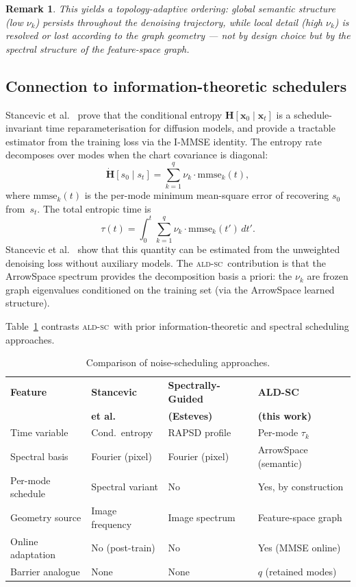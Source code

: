 \documentclass[11pt]{article}
\newtheorem{remark}{Remark}
\newcommand{\ALDSC}{\textsc{ald-sc}}
\begin{document}
\begin{remark}
This yields a topology-adaptive ordering: global semantic structure (low
\(\nu_k\)) persists throughout the denoising trajectory, while local detail
(high \(\nu_k\)) is resolved or lost according to the graph geometry --- not
by design choice but by the spectral structure of the feature-space graph.
\end{remark}

\subsection{Connection to information-theoretic schedulers}
\label{sec:stancevic}

Stancevic et al.~\cite{Stancevic2025} prove that the conditional entropy
\(\mathbf{H}[\mathbf{x}_0 \mid \mathbf{x}_t]\) is a schedule-invariant time
reparameterisation for diffusion models, and provide a tractable estimator
from the training loss via the I-MMSE identity. The entropy rate decomposes
over modes when the chart covariance is diagonal:
\[\dot{\mathbf{H}}[s_0 \mid s_t] = \sum_{k=1}^{q} \nu_k \cdot \mathrm{mmse}_k(t),\]
where \(\mathrm{mmse}_k(t)\) is the per-mode minimum mean-square error of
recovering \(s_0\) from~\(s_t\). The total entropic time is
\[\tau(t) = \int_0^t \sum_{k=1}^{q} \nu_k \cdot \mathrm{mmse}_k(t')\, dt'.\]
Stancevic et al.~\cite{Stancevic2025} show that this quantity can be estimated from the unweighted
denoising loss without auxiliary models. The \ALDSC~contribution is that the
ArrowSpace spectrum provides the decomposition basis a priori: the
\(\nu_k\) are frozen graph eigenvalues conditioned on the training set (via the ArrowSpace learned structure).

Table~\ref{tab:scheduler_comparison} contrasts \ALDSC~with prior
information-theoretic and spectral scheduling approaches.

\begin{table}[ht]
\centering
\small
\caption{Comparison of noise-scheduling approaches.}
\label{tab:scheduler_comparison}
\begin{tabular}{llll}
\toprule
\textbf{Feature} & \textbf{Stancevic} & \textbf{Spectrally-Guided} & \textbf{ALD-SC} \\
 & \textbf{et al.} & \textbf{(Esteves)} & \textbf{(this work)} \\
\midrule
Time variable & Cond.\ entropy & RAPSD profile & Per-mode \(\tau_k\) \\
Spectral basis & Fourier (pixel) & Fourier (pixel) & ArrowSpace (semantic) \\
Per-mode schedule & Spectral variant & No & Yes, by construction \\
Geometry source & Image frequency & Image spectrum & Feature-space graph \\
Online adaptation & No (post-train) & No & Yes (MMSE online) \\
Barrier analogue & None & None & \(q\) (retained modes) \\
\bottomrule
\end{tabular}
\end{table}
\end{document}
